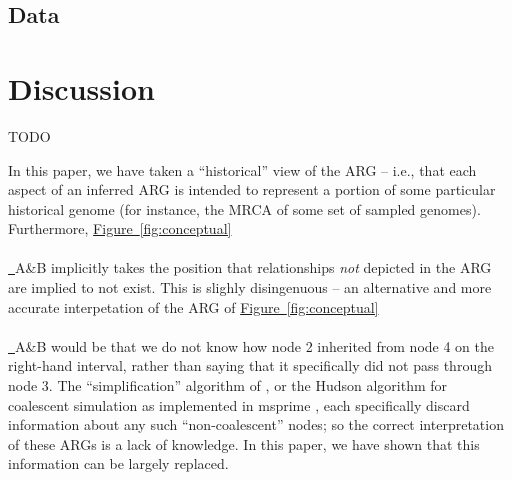 \documentclass[10pt,twoside,lineno]{gsajnl}
\newcommand*{\figref}[2][]{%
	\hyperref[{#2}]{%
		Figure~\ref*{#2}%
		\ifx\\#1\\%
		\else
		\,#1%
		\fi
	}%
}
\begin{document}
\subsection{Data}



\section{Discussion}

TODO

In this paper, we have taken a ``historical'' view of the ARG --
i.e., that each aspect of an inferred ARG is intended to represent
a portion of some particular historical genome
(for instance, the MRCA of some set of sampled genomes).
Furthermore, \figref{fig:conceptual}A\&B implicitly takes the position
that relationships \emph{not} depicted in the ARG are implied to not exist.
This is slighly disingenuous -- an alternative and more accurate interpetation
of the ARG of \figref{fig:conceptual}A\&B would be that we do not know
how node 2 inherited from node 4 on the right-hand interval,
rather than saying that it specifically did not pass through node 3.
The ``simplification'' algorithm of \citet{kelleher2018efficient},
or the Hudson algorithm for coalescent simulation
as implemented in msprime \citep{kelleher2016efficient},
each specifically discard information about any such ``non-coalescent'' nodes;
so the correct interpretation of these ARGs is a lack of knowledge.
In this paper, we have shown that this information can be largely replaced.
\end{document}
